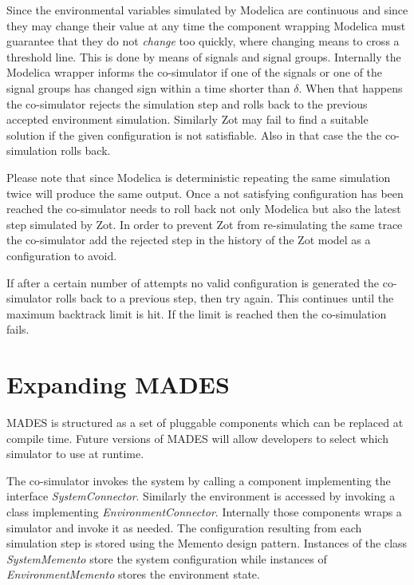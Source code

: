 \documentclass{kapproc} %
\begin{document}
Since the environmental variables simulated by Modelica are continuous and since they may change their value at any time the component wrapping Modelica must guarantee that they do not \emph{change} too quickly, where changing means to cross a threshold line. This is done by means of signals and signal groups. Internally the Modelica wrapper informs the co-simulator
if one of the signals or one of the signal groups has changed sign within a time shorter than $\delta$. When that happens the co-simulator rejects the simulation step and rolls back to the previous accepted environment simulation.  
Similarly Zot may fail to find a suitable solution if the given configuration is not satisfiable. Also in that case the the co-simulation rolls back.

Please note that since Modelica is deterministic repeating the same simulation twice will produce the same output. Once a not satisfying configuration has been reached the co-simulator needs to roll back not only Modelica but also the latest step simulated by Zot. In order to prevent Zot from re-simulating the same trace the co-simulator add the rejected step in the history of the Zot model as a configuration to avoid.

If after a certain number of attempts no valid configuration is generated the co-simulator rolls back to a previous step, then try again. This continues until the maximum backtrack limit is hit. If the limit is reached then the co-simulation fails. 

\section{Expanding MADES}
\label{section:expanding-mades}

MADES is structured as a set of pluggable components which can 
be replaced at compile time. Future versions of MADES will allow developers
to select which simulator to use at runtime.

The co-simulator invokes the system by calling a component implementing the interface \emph{SystemConnector}. Similarly the environment is accessed by invoking a class implementing
\emph{EnvironmentConnector}. Internally those components wraps a simulator and
invoke it as needed. The configuration resulting from each simulation step is stored using the Memento design pattern. Instances of the class \emph{SystemMemento} store the system configuration while instances of \emph{EnvironmentMemento} stores the environment state. 
\end{document}
